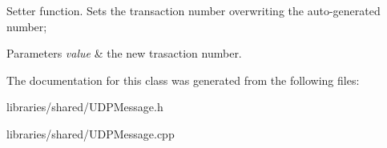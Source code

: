 Setter function. Sets the transaction number overwriting the auto-\/generated number; 
\begin{DoxyParams}{Parameters}
{\em value} & the new trasaction number. \\
\hline
\end{DoxyParams}


The documentation for this class was generated from the following files\+:\begin{DoxyCompactItemize}
\item 
libraries/shared/U\+D\+P\+Message.\+h\item 
libraries/shared/U\+D\+P\+Message.\+cpp\end{DoxyCompactItemize}
